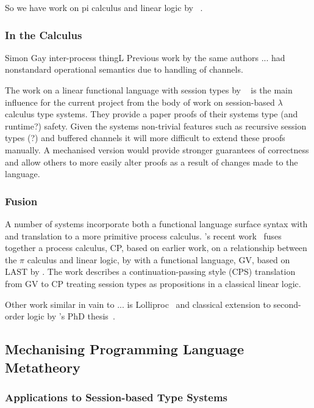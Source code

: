 \documentclass{mprop}
\begin{document}
So we have work on pi calculus and linear logic by \citeauthor{Caires:2010:STI}~\cite{Caires:2010:STI}.

\subsubsection{In the \lambda Calculus}\label{sec:lam}

Simon Gay inter-process thingL
Previous work by the same authors ... had nonstandard operational semantics due to handling of channels.

The work on a linear functional language with session types by \citeauthor{Gay:2010:LAST}~\cite{Gay:2010:LAST} is the main influence for the current project from the body of work on session-based $\lambda$ calculus type systems. They provide a paper proofs of their systems type (and runtime?) safety. 
Given the systems non-trivial features such as recursive session types (?) and buffered channels it will more difficult to extend these proofs manually. A mechanised version would provide stronger guarantees of correctness and allow others to more easily alter proofs as a result of changes made to the language.

\subsubsection{Fusion}

A number of systems incorporate both a functional language surface syntax with and translation to a more primitive process calculus. \citeauthor{Wadler:2012}'s recent work~\cite{Wadler:2012} fuses together a process calculus, CP, based on earlier work, on a relationship between the $\pi$ calculus and linear logic, by \citeauthor{Caires:2010:STI} with a functional language, GV, based on LAST by \citeauthor{Gay:2010:LAST}. The work describes a continuation-passing style (CPS) translation from GV to CP treating session types as propositions in a classical linear logic.

Other work similar in vain to ... is Lolliproc~\cite{Mazurak:2010:LCC} and classical extension to second-order logic by \citeauthor{Mazurak:2013:LPP}'s PhD thesis~\cite{Mazurak:2013:LPP}.

\subsection{Mechanising Programming Language Metatheory}

\subsubsection{Applications to Session-based Type Systems}\label{sec:asts}
\end{document}
